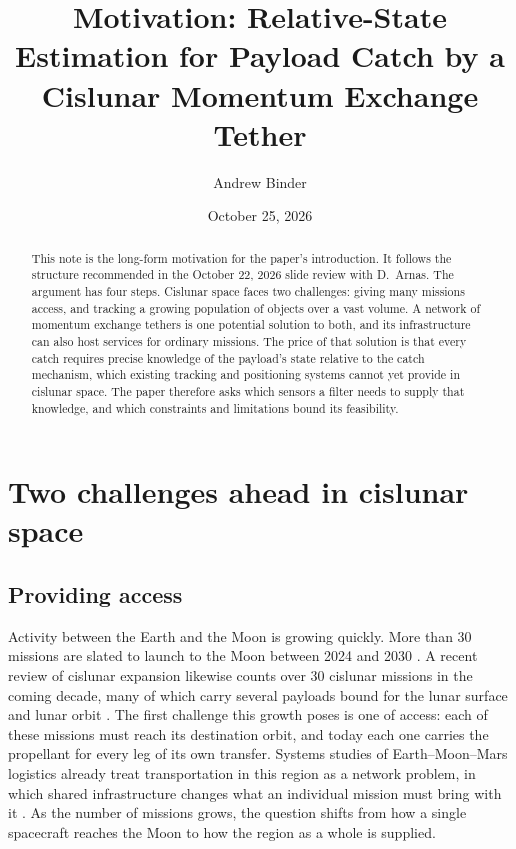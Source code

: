 \documentclass[11pt]{article}
\title{Motivation: Relative-State Estimation for Payload Catch by a Cislunar Momentum Exchange Tether}
\author{Andrew Binder}
\date{October 25, 2026}
\begin{document}
\maketitle

\begin{abstract}
This note is the long-form motivation for the paper's introduction.
It follows the structure recommended in the October 22, 2026 slide review with D.~Arnas.
The argument has four steps.
Cislunar space faces two challenges: giving many missions access, and tracking a growing population of objects over a vast volume.
A network of momentum exchange tethers is one potential solution to both, and its infrastructure can also host services for ordinary missions.
The price of that solution is that every catch requires precise knowledge of the payload's state relative to the catch mechanism, which existing tracking and positioning systems cannot yet provide in cislunar space.
The paper therefore asks which sensors a filter needs to supply that knowledge, and which constraints and limitations bound its feasibility.
\end{abstract}

\section{Two challenges ahead in cislunar space}\label{sec:challenges}

\subsection{Providing access}

Activity between the Earth and the Moon is growing quickly.
More than 30 missions are slated to launch to the Moon between 2024 and 2030 \parencite{GaTech2025Cislunar}.
A recent review of cislunar expansion likewise counts over 30 cislunar missions in the coming decade, many of which carry several payloads bound for the lunar surface and lunar orbit \parencite{BakerMcEvilly2024}.
The first challenge this growth poses is one of access: each of these missions must reach its destination orbit, and today each one carries the propellant for every leg of its own transfer.
Systems studies of Earth--Moon--Mars logistics already treat transportation in this region as a network problem, in which shared infrastructure changes what an individual mission must bring with it \parencite{Ishimatsu2016}.
As the number of missions grows, the question shifts from how a single spacecraft reaches the Moon to how the region as a whole is supplied.
\end{document}
